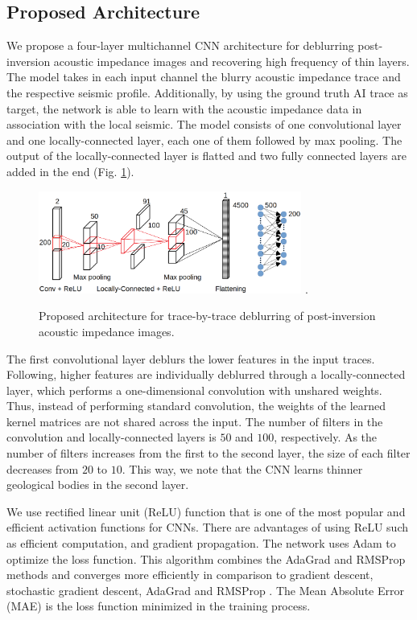 \documentclass[journal]{IEEEtran}
\begin{document}
\subsection{Proposed Architecture}
We propose a four-layer multichannel CNN architecture for deblurring
post-inversion acoustic impedance images and recovering high
frequency of thin layers. The model takes in each input channel the
blurry acoustic impedance trace and the respective seismic
profile. Additionally, by using the ground truth AI trace as
target, the network is able to learn with the acoustic
impedance data in association with the local seismic.
The model consists of one convolutional layer and one locally-connected
layer, each one of them followed by max pooling. The output of the
locally-connected layer is flatted and two fully connected layers are
added in the end (Fig. \ref{fig_model}).
\begin{figure}[!t]
\centering
\includegraphics[width=3.4in]{Figs/model}
\DeclareGraphicsExtensions.
\caption{Proposed architecture for trace-by-trace deblurring of post-inversion acoustic impedance
images.}
\label{fig_model}
\end{figure}

The first convolutional layer deblurs the lower features in
the input traces. Following, higher features are individually
deblurred through a locally-connected layer, %
which performs a one-dimensional convolution
with unshared weights. Thus, instead of performing standard
convolution, the weights of the learned kernel matrices are not
shared across the input. The number of filters in the convolution
and locally-connected layers is $50$ and $100$, respectively.
As the number of filters increases from the first to the
second layer, the size of each filter decreases from $20$ to $10$.
This way, we note that the CNN learns thinner geological
bodies in the second layer.

We use rectified linear unit (ReLU) function that is one
of the most popular and efficient activation functions for
CNNs. There are advantages of using ReLU such as efficient
computation, and gradient propagation. The network uses
Adam to optimize the loss function. This algorithm
combines the AdaGrad and RMSProp methods and converges more efficiently in
comparison to gradient descent, stochastic gradient descent, AdaGrad
and RMSProp \cite{Kingma2014}. The Mean Absolute Error (MAE) is the
loss function minimized in the training process.
\end{document}

